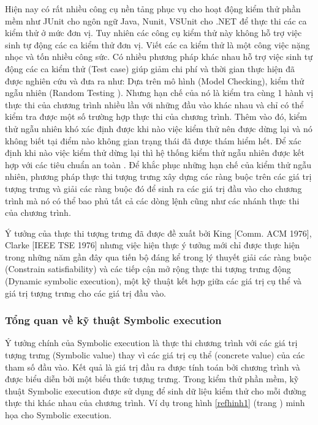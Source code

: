 \documentclass[12pt,a4paper]{article}
\begin{document}
\indent Hiện nay có rất nhiều công cụ nền tảng phục vụ cho hoạt động kiểm thử phần mềm như JUnit cho ngôn ngữ Java, Nunit, VSUnit cho .NET để thực thi các ca kiểm thử ở mức đơn vị. Tuy nhiên các công cụ kiểm thử này không hỗ trợ việc sinh tự động các ca kiểm thử đơn vị. Viết các ca kiểm thử là một công việc nặng nhọc và tốn nhiều công sức. Có nhiều phương pháp khác nhau hỗ trợ việc sinh tự động các ca kiểm thử (Test case) giúp giảm chi phí và thời gian thực hiện đã được nghiên cứu và đưa ra như: Dựa trên mô hình (Model Checking), kiểm thử ngẫu nhiên (Random Testing \cite{boyer1975select}). Nhưng hạn chế của nó là kiểm tra cùng 1 hành vị thực thi của chương trình nhiều lần với những đầu vào khác nhau và chỉ có thể kiểm tra được một số trường hợp thực thi của chương trình. Thêm vào đó, kiểm thử ngẫu nhiên khó xác định được khi nào việc kiểm thử nên được dừng lại và nó không biết tại điểm nào không gian trạng thái đã được thám hiểm hết. Để xác định khi nào việc kiểm thử dừng lại thì hệ thống kiểm thử ngẫu nhiên được kết hợp với các tiêu chuẩn an toàn \cite{zhu1997software}. Để khắc phục những hạn chế của kiểm thử ngẫu nhiên, phương pháp thực thi tượng trưng xây dựng các ràng buộc trên các giá trị tượng trưng và giải các ràng buộc đó để sinh ra các giá trị đầu vào cho chương trình mà nó có thể bao phủ tất cả các dòng lệnh cũng như các nhánh thực thi của chương trình.

\indent Ý tưởng của thực thi tượng trưng đã được đề xuất bởi King [Comm. ACM 1976], Clarke [IEEE TSE 1976] nhưng việc hiện thực ý tưởng mới chỉ được thực hiện trong những năm gần đây qua tiến bộ đáng kể trong lý thuyết giải các ràng buộc (Constrain satisfiability) \cite{de2011satisfiability} và các tiếp cận mở rộng thực thi tượng trưng động (Dynamic symbolic execution), một kỹ thuật kết hợp giữa các giá trị cụ thể và giá trị 
tượng trưng cho các giá trị đầu vào.

\subsubsection{Tổng quan về kỹ thuật Symbolic execution}
Ý tưởng chính của Symbolic execution là thực thi chương trình với các giá trị tượng trưng (Symbolic value) thay vì các giá trị cụ thể (concrete value) của các tham số đầu vào. Kết quả là giá trị đầu ra được tính toán bởi chương trình và được biểu diễn bởi một biểu thức tượng trưng. Trong kiểm thử phần mềm, kỹ thuật Symbolic execution được sử dụng để sinh dữ liệu kiểm thử cho mỗi đường thực thi khác nhau của chương trình. Ví dụ trong hình \ref{refhinh1} (trang \pageref{refhinh1}) minh họa cho Symbolic execution.
\end{document}
